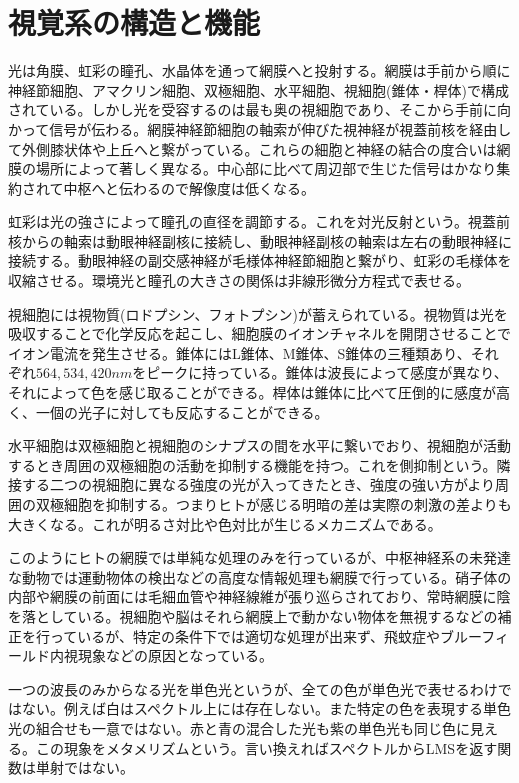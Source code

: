 
\section{視覚系の構造と機能}
	光は角膜、虹彩の瞳孔、水晶体を通って網膜へと投射する。網膜は手前から順に神経節細胞、アマクリン細胞、双極細胞、水平細胞、視細胞(錐体・桿体)で構成されている。しかし光を受容するのは最も奥の視細胞であり、そこから手前に向かって信号が伝わる。網膜神経節細胞の軸索が伸びた視神経が視蓋前核を経由して外側膝状体や上丘へと繋がっている。これらの細胞と神経の結合の度合いは網膜の場所によって著しく異なる。中心部に比べて周辺部で生じた信号はかなり集約されて中枢へと伝わるので解像度は低くなる。

	虹彩は光の強さによって瞳孔の直径を調節する。これを対光反射という。視蓋前核からの軸索は動眼神経副核に接続し、動眼神経副核の軸索は左右の動眼神経に接続する。動眼神経の副交感神経が毛様体神経節細胞と繋がり、虹彩の毛様体を収縮させる。環境光と瞳孔の大きさの関係は非線形微分方程式で表せる。

	視細胞には視物質(ロドプシン、フォトプシン)が蓄えられている。視物質は光を吸収することで化学反応を起こし、細胞膜のイオンチャネルを開閉させることでイオン電流を発生させる。錐体にはL錐体、M錐体、S錐体の三種類あり、それぞれ$564, 534, 420nm$をピークに持っている。錐体は波長によって感度が異なり、それによって色を感じ取ることができる。桿体は錐体に比べて圧倒的に感度が高く、一個の光子に対しても反応することができる。

	水平細胞は双極細胞と視細胞のシナプスの間を水平に繋いでおり、視細胞が活動するとき周囲の双極細胞の活動を抑制する機能を持つ。これを側抑制という。隣接する二つの視細胞に異なる強度の光が入ってきたとき、強度の強い方がより周囲の双極細胞を抑制する。つまりヒトが感じる明暗の差は実際の刺激の差よりも大きくなる。これが明るさ対比や色対比が生じるメカニズムである。

	このようにヒトの網膜では単純な処理のみを行っているが、中枢神経系の未発達な動物では運動物体の検出などの高度な情報処理も網膜で行っている。硝子体の内部や網膜の前面には毛細血管や神経線維が張り巡らされており、常時網膜に陰を落としている。視細胞や脳はそれら網膜上で動かない物体を無視するなどの補正を行っているが、特定の条件下では適切な処理が出来ず、飛蚊症やブルーフィールド内視現象などの原因となっている。

	一つの波長のみからなる光を単色光というが、全ての色が単色光で表せるわけではない。例えば白はスペクトル上には存在しない。また特定の色を表現する単色光の組合せも一意ではない。赤と青の混合した光も紫の単色光も同じ色に見える。この現象をメタメリズムという。言い換えればスペクトルからLMSを返す関数は単射ではない。

